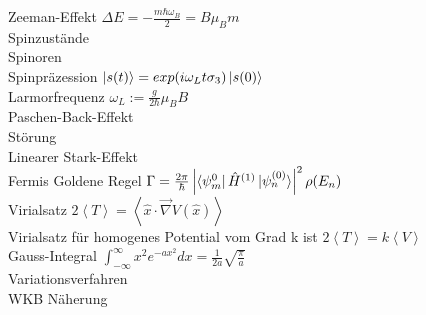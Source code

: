\documentclass{article}
\begin{document}
Zeeman-Effekt $\Delta E = - \frac{m \hbar \omega_B}{2} = B \mu_B m$ \\

Spinzust\"ande \\

Spinoren \\

Spinpr\"azession $\ket{s(t)} = exp(i \omega_L t \sigma_3) \ket{s(0)} $ \\

Larmorfrequenz $\omega_L := \frac{g}{2 \hbar} \mu_B B$ \\

Paschen-Back-Effekt \\

St\"orung \\

Linearer Stark-Effekt \\

Fermis Goldene Regel $\Gamma = \frac{2\pi}{\hbar} \left| \bra{\psi_m^{0}} \hat{H}^{(1)} \ket{\psi_n^{(0)}} \right|^2 \rho(E_n) $\\

Virialsatz $2 \left< T \right> = \left< \hat{x} \cdot \vec{\nabla}V(\hat{x}) \right> $ \\

Virialsatz f\"ur homogenes Potential vom Grad k ist $2 \left< T \right> = k \left< V \right> $ \\

Gauss-Integral $ \int_{-\infty}^{\infty}x^2e^{-ax^2} dx = \frac{1}{2a} \sqrt{\frac{\pi}{a}}$ \\

Variationsverfahren \\

WKB N\"aherung \\
\end{document}
